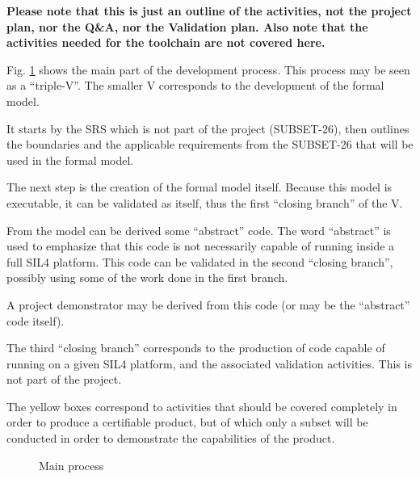 \documentclass{template/openetcs_article}
\begin{document}
\textbf{Please note that this is just an outline of the activities, not the project plan, nor the 
Q\&A, nor the Validation plan. Also note that the activities needed for the toolchain are not
covered here.}

Fig. \ref{fig:main_process} shows the main part of the development process. This process may be seen
as a ``triple-V''. The smaller V corresponds to the development of the formal model. 

It starts by the SRS which is not part of the project (SUBSET-26), then outlines the boundaries and 
the applicable requirements from the SUBSET-26 that will be used in the formal model. 

The next step is the creation of the formal model itself. Because this model is executable, it can 
be validated as itself, thus the first ``closing branch'' of the V.

From the model can be derived some ``abstract'' code. The word ``abstract'' is used to emphasize that 
this code is not necessarily capable of running inside a full SIL4 platform. This code can be validated 
in the second ``closing branch'', possibly using some of the work done in the first branch. 

A project demonstrator may be derived from this code (or may be the ``abstract'' code itself).

The third ``closing branch'' corresponds to the production of code capable of running on a 
given SIL4 platform, and the associated validation activities. This is not part of the project.

The yellow boxes correspond	 to activities that should be covered completely in order to produce 
a certifiable product, but of which only a subset will be conducted in order to demonstrate the 
capabilities of the product.

\begin{figure}
  \centering
  \caption{Main process}
  \label{fig:main_process}
\end{figure}
\end{document}
